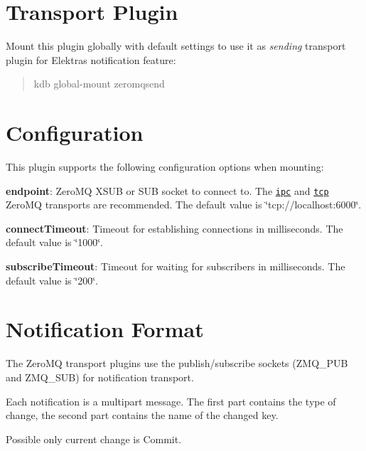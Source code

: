 \section*{Transport Plugin}

Mount this plugin globally with default settings to use it as {\itshape sending} transport plugin for Elektra\textquotesingle{}s notification feature\+:

\begin{quote}
kdb global-\/mount zeromqsend \end{quote}


\section*{Configuration}

This plugin supports the following configuration options when mounting\+:


\begin{DoxyItemize}
\item {\bfseries endpoint}\+: Zero\+MQ X\+S\+UB or S\+UB socket to connect to. The \href{http://api.zeromq.org/4-2:zmq-ipc}{\tt {\ttfamily ipc}} and \href{http://api.zeromq.org/4-2:zmq-tcp}{\tt {\ttfamily tcp}} Zero\+MQ transports are recommended. The default value is \char`\"{}tcp\+://localhost\+:6000\char`\"{}.
\item {\bfseries connect\+Timeout}\+: Timeout for establishing connections in milliseconds. The default value is \char`\"{}1000\char`\"{}.
\item {\bfseries subscribe\+Timeout}\+: Timeout for waiting for subscribers in milliseconds. The default value is \char`\"{}200\char`\"{}.
\end{DoxyItemize}

\section*{Notification Format}

The Zero\+MQ transport plugins use the publish/subscribe sockets ({\ttfamily Z\+M\+Q\+\_\+\+P\+UB} and {\ttfamily Z\+M\+Q\+\_\+\+S\+UB}) for notification transport.

Each notification is a multipart message. The first part contains the type of change, the second part contains the name of the changed key.

Possible only current change is {\ttfamily Commit}. 